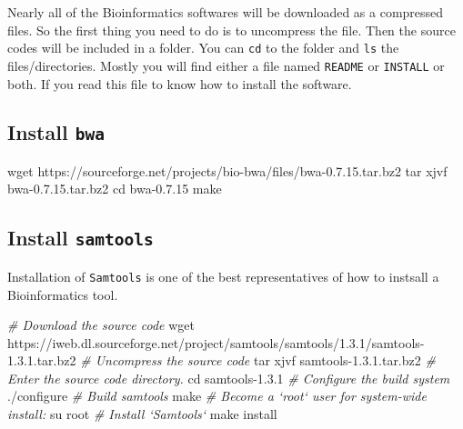\documentclass[]{book}
\makeatletter
\newenvironment{Shaded}{\begin{snugshade}}{\end{snugshade}}
\newcommand{\BuiltInTok}[1]{#1}
\newcommand{\CommentTok}[1]{\textcolor[rgb]{0.56,0.35,0.01}{\textit{#1}}}
\newcommand{\ExtensionTok}[1]{#1}
\newcommand{\FunctionTok}[1]{\textcolor[rgb]{0.00,0.00,0.00}{#1}}
\newcommand{\NormalTok}[1]{#1}
\newenvironment{kframe}{%
\medskip{}
\setlength{\fboxsep}{.8em}
 \def\at@end@of@kframe{}%
 \ifinner\ifhmode%
  \def\at@end@of@kframe{\end{minipage}}%
  \begin{minipage}{\columnwidth}%
 \fi\fi%
 \def\FrameCommand##1{\hskip\@totalleftmargin \hskip-\fboxsep
 \colorbox{shadecolor}{##1}\hskip-\fboxsep
     \hskip-\linewidth \hskip-\@totalleftmargin \hskip\columnwidth}%
 \MakeFramed {\advance\hsize-\width
   \@totalleftmargin\z@ \linewidth\hsize
   \@setminipage}}%
 {\par\unskip\endMakeFramed%
 \at@end@of@kframe}
\renewenvironment{Shaded}{\begin{kframe}}{\end{kframe}}
\makeatother
\begin{document}
Nearly all of the Bioinformatics softwares will be downloaded as a compressed files. So the first thing you need to do is to uncompress the file. Then the source codes will be included in a folder. You can \texttt{cd} to the folder and \texttt{ls} the files/directories. Mostly you will find either a file named \texttt{README} or \texttt{INSTALL} or both. If you read this file to know how to install the software.

\hypertarget{install-bwa}{%
\subsection{\texorpdfstring{Install \texttt{bwa}}{Install bwa}}\label{install-bwa}}

\begin{Shaded}
\begin{Highlighting}[]
\FunctionTok{wget}\NormalTok{ https://sourceforge.net/projects/bio-bwa/files/bwa-0.7.15.tar.bz2}
\FunctionTok{tar}\NormalTok{ xjvf bwa-0.7.15.tar.bz2}
\BuiltInTok{cd}\NormalTok{ bwa-0.7.15}
\FunctionTok{make}
\end{Highlighting}
\end{Shaded}

\hypertarget{install-samtools}{%
\subsection{\texorpdfstring{Install \texttt{samtools}}{Install samtools}}\label{install-samtools}}

Installation of \texttt{Samtools} is one of the best representatives of how to instsall a Bioinformatics tool.

\begin{Shaded}
\begin{Highlighting}[]
\CommentTok{# Download the source code}
\FunctionTok{wget}\NormalTok{ https://iweb.dl.sourceforge.net/project/samtools/samtools/1.3.1/samtools-1.3.1.tar.bz2}
\CommentTok{# Uncompress the source code}
\FunctionTok{tar}\NormalTok{ xjvf samtools-1.3.1.tar.bz2}
\CommentTok{# Enter the source code directory.}
\BuiltInTok{cd}\NormalTok{ samtools-1.3.1}
\CommentTok{# Configure the build system}
\ExtensionTok{./configure}
\CommentTok{# Build samtools}
\FunctionTok{make}
\CommentTok{# Become a `root` user for system-wide install:}
\FunctionTok{su}\NormalTok{ root}
\CommentTok{# Install `Samtools`}
\FunctionTok{make}\NormalTok{ install}
\end{Highlighting}
\end{Shaded}
\end{document}

